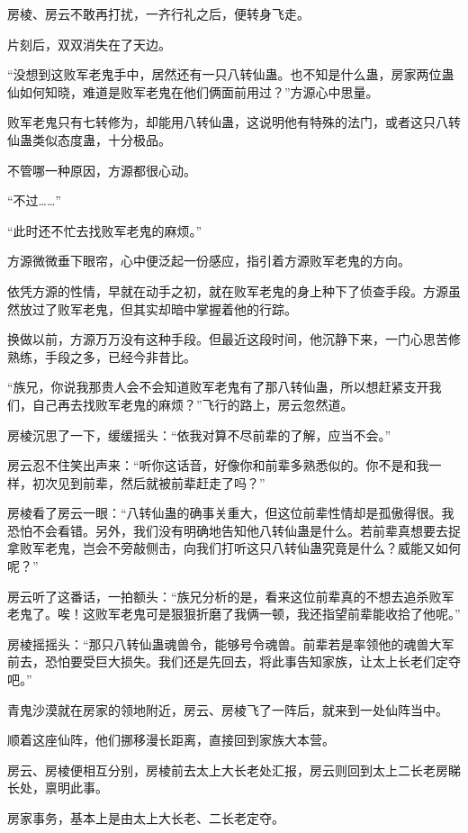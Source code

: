 \begin{this_body}
房棱、房云不敢再打扰，一齐行礼之后，便转身飞走。

片刻后，双双消失在了天边。

“没想到这败军老鬼手中，居然还有一只八转仙蛊。也不知是什么蛊，房家两位蛊仙如何知晓，难道是败军老鬼在他们俩面前用过？”方源心中思量。

败军老鬼只有七转修为，却能用八转仙蛊，这说明他有特殊的法门，或者这只八转仙蛊类似态度蛊，十分极品。

不管哪一种原因，方源都很心动。

“不过……”

“此时还不忙去找败军老鬼的麻烦。”

方源微微垂下眼帘，心中便泛起一份感应，指引着方源败军老鬼的方向。

依凭方源的性情，早就在动手之初，就在败军老鬼的身上种下了侦查手段。方源虽然放过了败军老鬼，但其实却暗中掌握着他的行踪。

换做以前，方源万万没有这种手段。但最近这段时间，他沉静下来，一门心思苦修熟练，手段之多，已经今非昔比。

“族兄，你说我那贵人会不会知道败军老鬼有了那八转仙蛊，所以想赶紧支开我们，自己再去找败军老鬼的麻烦？”飞行的路上，房云忽然道。

房棱沉思了一下，缓缓摇头：“依我对算不尽前辈的了解，应当不会。”

房云忍不住笑出声来：“听你这话音，好像你和前辈多熟悉似的。你不是和我一样，初次见到前辈，然后就被前辈赶走了吗？”

房棱看了房云一眼：“八转仙蛊的确事关重大，但这位前辈性情却是孤傲得很。我恐怕不会看错。另外，我们没有明确地告知他八转仙蛊是什么。若前辈真想要去捉拿败军老鬼，岂会不旁敲侧击，向我们打听这只八转仙蛊究竟是什么？威能又如何呢？”

房云听了这番话，一拍额头：“族兄分析的是，看来这位前辈真的不想去追杀败军老鬼了。唉！这败军老鬼可是狠狠折磨了我俩一顿，我还指望前辈能收拾了他呢。”

房棱摇摇头：“那只八转仙蛊魂兽令，能够号令魂兽。前辈若是率领他的魂兽大军前去，恐怕要受巨大损失。我们还是先回去，将此事告知家族，让太上长老们定夺吧。”

青鬼沙漠就在房家的领地附近，房云、房棱飞了一阵后，就来到一处仙阵当中。

顺着这座仙阵，他们挪移漫长距离，直接回到家族大本营。

房云、房棱便相互分别，房棱前去太上大长老处汇报，房云则回到太上二长老房睇长处，禀明此事。

房家事务，基本上是由太上大长老、二长老定夺。


\end{this_body}
